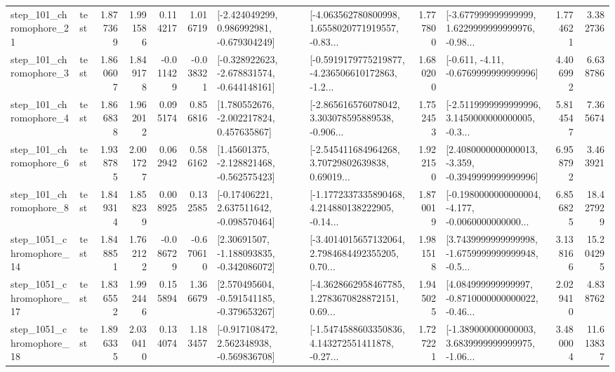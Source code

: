 \begin{tabular}{llrrrrllrlrr}
  step\_101\_chromophore\_21 &      test &      1.877369 &    1.991586 &      0.114217 &  1.016719 &   [-2.424049299, 0.986992981, -0.679304249] &  [-4.063562780800998, 1.6558020771919557, -0.83... &       1.777800 &  [-3.677999999999999, 1.6229999999999976, -0.98... &            1.774621 &          3.382736 \\
   step\_101\_chromophore\_3 &      test &      1.860607 &    1.849178 &     -0.011429 & -0.038321 &  [-0.328922623, -2.678831574, -0.644148161] &  [-0.5919179775219877, -4.236506610172863, -1.2... &       1.680200 &               [-0.611, -4.11, -0.6769999999999996] &            4.406992 &          6.638786 \\
   step\_101\_chromophore\_4 &      test &      1.866838 &    1.962012 &      0.095174 &  0.856816 &    [1.780552676, -2.002217824, 0.457635867] &  [-2.865616576078042, 3.303078595889538, -0.906... &       1.752453 &  [-2.5119999999999996, 3.1450000000000005, -0.3... &            5.814547 &          7.365674 \\
   step\_101\_chromophore\_6 &      test &      1.938785 &    2.001727 &      0.062942 &  0.586162 &    [1.45601375, -2.128821468, -0.562575423] &  [-2.545411684964268, 3.70729802639838, 0.69019... &       1.922150 &  [2.4080000000000013, -3.359, -0.3949999999999996] &            6.958792 &          3.463921 \\
   step\_101\_chromophore\_8 &      test &      1.849314 &    1.858239 &      0.008925 &  0.132585 &    [-0.17406221, 2.637511642, -0.098570464] &  [-1.1772337335890468, 4.214880138222905, -0.14... &       1.870019 &  [-0.1980000000000004, -4.177, -0.0060000000000... &            6.856825 &         18.427929 \\
 step\_1051\_chromophore\_14 &      test &      1.848851 &    1.762122 &     -0.086729 & -0.670610 &    [2.30691507, -1.188093835, -0.342086072] &  [-3.4014015657132064, 2.7984684492355205, 0.70... &       1.981518 &  [3.7439999999999998, -1.6759999999999948, -0.5... &            3.138166 &         15.204295 \\
 step\_1051\_chromophore\_17 &      test &      1.836552 &    1.992446 &      0.155894 &  1.366679 &   [2.570495604, -0.591541185, -0.379653267] &  [-4.3628662958467785, 1.2783670828872151, 0.69... &       1.945025 &  [4.084999999999997, -0.8710000000000022, -0.46... &            2.029410 &          4.838762 \\
 step\_1051\_chromophore\_18 &      test &      1.896335 &    2.030410 &      0.134074 &  1.183457 &   [-0.917108472, 2.562348938, -0.569836708] &  [-1.5474588603350836, 4.143272551411878, -0.27... &       1.727221 &  [-1.389000000000003, 3.6839999999999975, -1.06... &            3.480004 &         11.613837 \\

\end{tabular}
